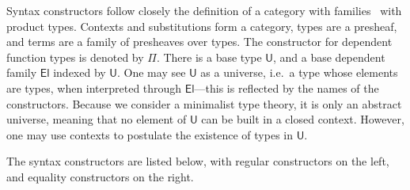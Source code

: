 \documentclass[a4paper,UKenglish,cleveref]{lipics-v2019}
\newcommand{\agdaSymb}[1]{\mathsf{#1}}
\newcommand{\U}{\agdaSymb{U}}
\newcommand{\El}{\agdaSymb{El}}
\begin{document}
Syntax constructors follow closely the definition of a category with
families~\cite{dybjer1995cwf,hofmann1997syntax} with product types. Contexts
and substitutions form a category, types are a presheaf, and terms are a family
of presheaves over types. The constructor for dependent function types is
denoted by $\Pi$. There is a base type $\U$, and a base dependent family $\El$
indexed by $\U$. One may see $\U$ as a universe, i.e.\ a type whose elements
are types, when interpreted through $\El$---this is reflected by the names of
the constructors. Because we consider a minimalist type theory, it is only an
abstract universe, meaning that no element of $\U$ can be built in a
closed context. However, one may use contexts to postulate the existence of
types in $\U$.

The syntax constructors are listed below, with regular constructors on the
left, and equality constructors on the right.
\end{document}
